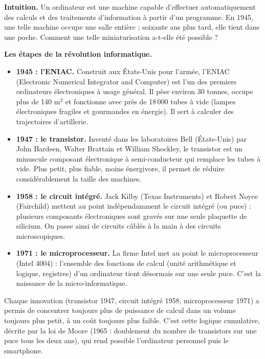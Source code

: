 \documentclass[11pt]{article}
\newcommand{\cle}[1]{{\popxbold\color{popdark}#1}}
\begin{document}
\textbf{Intuition.} Un ordinateur est une machine capable d'effectuer automatiquement des calculs et des traitements d'information à partir d'un programme. En 1945, une telle machine occupe une salle entière ; soixante ans plus tard, elle tient dans une poche. Comment une telle \cle{miniaturisation} a-t-elle été possible ?

\textbf{Les étapes de la révolution informatique.}

\begin{itemize}
\item \textbf{1945 : l'ENIAC.} Construit aux États-Unis pour l'armée, l'\cle{ENIAC} (Electronic Numerical Integrator and Computer) est l'un des premiers ordinateurs électroniques à usage général. Il pèse environ 30 tonnes, occupe plus de 140 m$^2$ et fonctionne avec près de 18\,000 tubes à vide (lampes électroniques fragiles et gourmandes en énergie). Il sert à calculer des trajectoires d'artillerie.
\item \textbf{1947 : le transistor.} Inventé dans les laboratoires Bell (États-Unis) par John Bardeen, Walter Brattain et William Shockley, le \cle{transistor} est un minuscule composant électronique à semi-conducteur qui remplace les tubes à vide. Plus petit, plus fiable, moins énergivore, il permet de réduire considérablement la taille des machines.
\item \textbf{1958 : le circuit intégré.} Jack Kilby (Texas Instruments) et Robert Noyce (Fairchild) mettent au point indépendamment le \cle{circuit intégré} (ou puce) : plusieurs composants électroniques sont gravés sur une seule plaquette de silicium. On passe ainsi de circuits câblés à la main à des circuits microscopiques.
\item \textbf{1971 : le microprocesseur.} La firme Intel met au point le \cle{microprocesseur} (Intel 4004) : l'ensemble des fonctions de calcul (unité arithmétique et logique, registres) d'un ordinateur tient désormais sur une seule puce. C'est la naissance de la micro-informatique.
\end{itemize}

\begin{aretenir}
Chaque innovation (transistor 1947, circuit intégré 1958, microprocesseur 1971) a permis de concentrer toujours plus de puissance de calcul dans un volume toujours plus petit, à un coût toujours plus faible. C'est cette logique cumulative, décrite par la \cle{loi de Moore} (1965 : doublement du nombre de transistors sur une puce tous les deux ans), qui rend possible l'ordinateur personnel puis le smartphone.
\end{aretenir}
\end{document}
